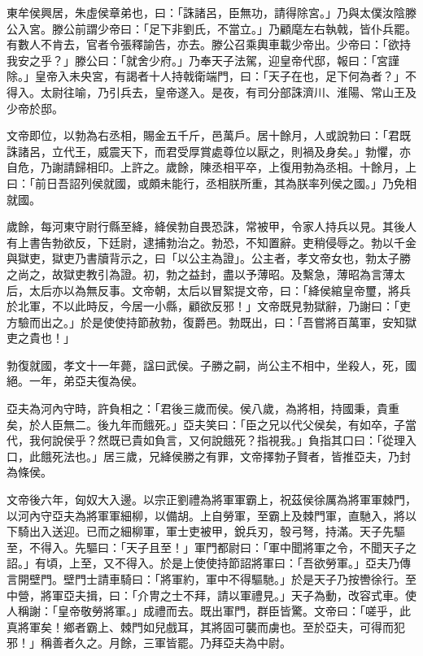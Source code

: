 \begin{pinyinscope}
東牟侯興居，朱虛侯章弟也，曰：「誅諸呂，臣無功，請得除宮。」乃與太僕汝陰滕公入宮。滕公前謂少帝曰：「足下非劉氏，不當立。」乃顧麾左右執戟，皆仆兵罷。有數人不肯去，官者令張釋諭告，亦去。滕公召乘輿車載少帝出。少帝曰：「欲持我安之乎？」滕公曰：「就舍少府。」乃奉天子法駕，迎皇帝代邸，報曰：「宮謹除。」皇帝入未央宮，有謁者十人持戟衛端門，曰：「天子在也，足下何為者？」不得入。太尉往喻，乃引兵去，皇帝遂入。是夜，有司分部誅濟川、淮陽、常山王及少帝於邸。

文帝即位，以勃為右丞相，賜金五千斤，邑萬戶。居十餘月，人或說勃曰：「君既誅諸呂，立代王，威震天下，而君受厚賞處尊位以厭之，則禍及身矣。」勃懼，亦自危，乃謝請歸相印。上許之。歲餘，陳丞相平卒，上復用勃為丞相。十餘月，上曰：「前日吾詔列侯就國，或頗未能行，丞相朕所重，其為朕率列侯之國。」乃免相就國。

歲餘，每河東守尉行縣至絳，絳侯勃自畏恐誅，常被甲，令家人持兵以見。其後人有上書告勃欲反，下廷尉，逮捕勃治之。勃恐，不知置辭。吏稍侵辱之。勃以千金與獄吏，獄吏乃書牘背示之，曰「以公主為證」。公主者，孝文帝女也，勃太子勝之尚之，故獄吏教引為證。初，勃之益封，盡以予薄昭。及繫急，薄昭為言薄太后，太后亦以為無反事。文帝朝，太后以冒絮提文帝，曰：「絳侯綰皇帝璽，將兵於北軍，不以此時反，今居一小縣，顧欲反邪！」文帝既見勃獄辭，乃謝曰：「吏方驗而出之。」於是使使持節赦勃，復爵邑。勃既出，曰：「吾嘗將百萬軍，安知獄吏之貴也！」

勃復就國，孝文十一年薨，諡曰武侯。子勝之嗣，尚公主不相中，坐殺人，死，國絕。一年，弟亞夫復為侯。

亞夫為河內守時，許負相之：「君後三歲而侯。侯八歲，為將相，持國秉，貴重矣，於人臣無二。後九年而餓死。」亞夫笑曰：「臣之兄以代父侯矣，有如卒，子當代，我何說侯乎？然既已貴如負言，又何說餓死？指視我。」負指其口曰：「從理入口，此餓死法也。」居三歲，兄絳侯勝之有罪，文帝擇勃子賢者，皆推亞夫，乃封為條侯。

文帝後六年，匈奴大入邊。以宗正劉禮為將軍軍霸上，祝茲侯徐厲為將軍軍棘門，以河內守亞夫為將軍軍細柳，以備胡。上自勞軍，至霸上及棘門軍，直馳入，將以下騎出入送迎。已而之細柳軍，軍士吏被甲，銳兵刃，彀弓弩，持滿。天子先驅至，不得入。先驅曰：「天子且至！」軍門都尉曰：「軍中聞將軍之令，不聞天子之詔。」有頃，上至，又不得入。於是上使使持節詔將軍曰：「吾欲勞軍。」亞夫乃傳言開壁門。壁門士請車騎曰：「將軍約，軍中不得驅馳。」於是天子乃按轡徐行。至中營，將軍亞夫揖，曰：「介冑之士不拜，請以軍禮見。」天子為動，改容式車。使人稱謝：「皇帝敬勞將軍。」成禮而去。既出軍門，群臣皆驚。文帝曰：「嗟乎，此真將軍矣！鄉者霸上、棘門如兒戲耳，其將固可襲而虜也。至於亞夫，可得而犯邪！」稱善者久之。月餘，三軍皆罷。乃拜亞夫為中尉。


\end{pinyinscope}
